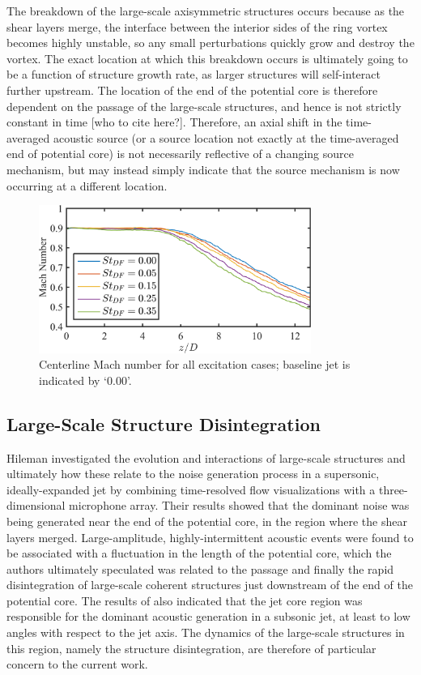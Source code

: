 The breakdown of the large-scale axisymmetric structures occurs because as the shear layers merge, the interface between the interior sides of the ring vortex becomes highly unstable, so any small perturbations quickly grow and destroy the vortex.
The exact location at which this breakdown occurs is ultimately going to be a function of structure growth rate, as larger structures will self-interact further upstream.
The location of the end of the potential core is therefore dependent on the passage of the large-scale structures, and hence is not strictly constant in time [who to cite here?].
Therefore, an axial shift in the time-averaged acoustic source (or a source location not exactly at the time-averaged end of potential core) is not necessarily reflective of a changing source mechanism, but may instead simply indicate that the source mechanism is now occurring at a different location.
\begin{figure}
	\centering
	\includegraphics[width = 3.5in]{Figures/ch4_centerlineMach.png}
	\caption{Centerline Mach number for all excitation cases; baseline jet is indicated by `0.00'.}
	\label{fig:ch4_centerlinemach}
\end{figure}

\subsection{Large-Scale Structure Disintegration}
Hileman \etal \citep{Hileman2005} investigated the evolution and interactions of large-scale structures and ultimately how these relate to the noise generation process in a supersonic, ideally-expanded jet by combining time-resolved flow visualizations with a three-dimensional microphone array.
Their results showed that the dominant noise was being generated near the end of the potential core, in the region where the shear layers merged.
Large-amplitude, highly-intermittent acoustic events were found to be associated with a fluctuation in the length of the potential core, which the authors ultimately speculated was related to the passage and finally the rapid disintegration of large-scale coherent structures just downstream of the end of the potential core.
The results of  also indicated that the jet core region was responsible for the dominant acoustic generation in a subsonic jet, at least to low angles with respect to the jet axis.
The dynamics of the large-scale structures in this region, namely the structure disintegration, are therefore of particular concern to the current work.

